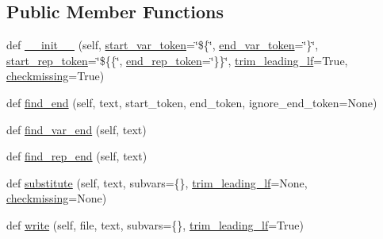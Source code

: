 \subsection*{Public Member Functions}
\begin{DoxyCompactItemize}
\item 
def \mbox{\hyperlink{classpymavlink_1_1generator_1_1mavtemplate_1_1MAVTemplate_ab207ac14ad832a9a2ff313e32a8abf43}{\+\_\+\+\_\+init\+\_\+\+\_\+}} (self, \mbox{\hyperlink{classpymavlink_1_1generator_1_1mavtemplate_1_1MAVTemplate_a3c23d8906358f0772059ace68fe51c3b}{start\+\_\+var\+\_\+token}}=\char`\"{}\$\{\char`\"{}, \mbox{\hyperlink{classpymavlink_1_1generator_1_1mavtemplate_1_1MAVTemplate_a3cc7fc0f3ac740977bcbc8374d61237c}{end\+\_\+var\+\_\+token}}=\char`\"{}\}\char`\"{}, \mbox{\hyperlink{classpymavlink_1_1generator_1_1mavtemplate_1_1MAVTemplate_aaab90f1760823bf4f248800c3d9ad8e2}{start\+\_\+rep\+\_\+token}}=\char`\"{}\$\{\{\char`\"{}, \mbox{\hyperlink{classpymavlink_1_1generator_1_1mavtemplate_1_1MAVTemplate_a203012f23c38d0181facaf48ab213ac7}{end\+\_\+rep\+\_\+token}}=\char`\"{}\}\}\char`\"{}, \mbox{\hyperlink{classpymavlink_1_1generator_1_1mavtemplate_1_1MAVTemplate_a5471968b23f4052165d0183b306b707f}{trim\+\_\+leading\+\_\+lf}}=True, \mbox{\hyperlink{classpymavlink_1_1generator_1_1mavtemplate_1_1MAVTemplate_ab10ae4c8e485d08cdb59cd51a0952663}{checkmissing}}=True)
\item 
def \mbox{\hyperlink{classpymavlink_1_1generator_1_1mavtemplate_1_1MAVTemplate_a4a97cc1d4bfbd4e32953f364507fada8}{find\+\_\+end}} (self, text, start\+\_\+token, end\+\_\+token, ignore\+\_\+end\+\_\+token=None)
\item 
def \mbox{\hyperlink{classpymavlink_1_1generator_1_1mavtemplate_1_1MAVTemplate_a627b9f64b13bece04d2711ce25beaba2}{find\+\_\+var\+\_\+end}} (self, text)
\item 
def \mbox{\hyperlink{classpymavlink_1_1generator_1_1mavtemplate_1_1MAVTemplate_ac653ff2519c9aa35c4ae2df3f97114c5}{find\+\_\+rep\+\_\+end}} (self, text)
\item 
def \mbox{\hyperlink{classpymavlink_1_1generator_1_1mavtemplate_1_1MAVTemplate_adf6f114f842c14ecb4f8b41a0eeba60c}{substitute}} (self, text, subvars=\{\}, \mbox{\hyperlink{classpymavlink_1_1generator_1_1mavtemplate_1_1MAVTemplate_a5471968b23f4052165d0183b306b707f}{trim\+\_\+leading\+\_\+lf}}=None, \mbox{\hyperlink{classpymavlink_1_1generator_1_1mavtemplate_1_1MAVTemplate_ab10ae4c8e485d08cdb59cd51a0952663}{checkmissing}}=None)
\item 
def \mbox{\hyperlink{classpymavlink_1_1generator_1_1mavtemplate_1_1MAVTemplate_a8d8b9f9e281c877cad428f3a28ae61d0}{write}} (self, file, text, subvars=\{\}, \mbox{\hyperlink{classpymavlink_1_1generator_1_1mavtemplate_1_1MAVTemplate_a5471968b23f4052165d0183b306b707f}{trim\+\_\+leading\+\_\+lf}}=True)
\end{DoxyCompactItemize}
